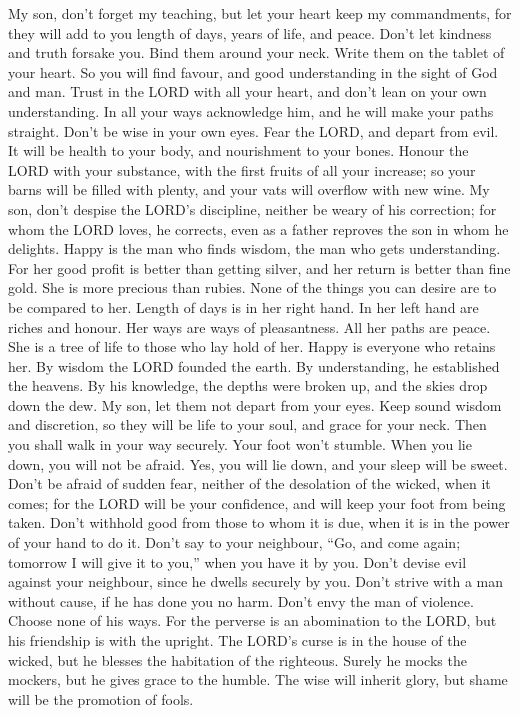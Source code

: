  My son, don't forget my teaching, but let your heart keep
my commandments,  for they will add to you length of days,
years of life, and peace.  Don't let kindness and truth
forsake you. Bind them around your neck. Write them on the tablet of
your heart.  So you will find favour, and good understanding
in the sight of God and man.  Trust in the LORD with all
your heart, and don't lean on your own understanding.  In
all your ways acknowledge him, and he will make your paths straight.
 Don't be wise in your own eyes. Fear the LORD, and depart
from evil.  It will be health to your body, and nourishment
to your bones.  Honour the LORD with your substance, with
the first fruits of all your increase;  so your barns will
be filled with plenty, and your vats will overflow with new wine.
 My son, don't despise the LORD's discipline, neither be
weary of his correction;  for whom the LORD loves, he
corrects, even as a father reproves the son in whom he delights.
 Happy is the man who finds wisdom, the man who gets
understanding.  For her good profit is better than getting
silver, and her return is better than fine gold.  She is
more precious than rubies. None of the things you can desire are to be
compared to her.  Length of days is in her right hand. In
her left hand are riches and honour.  Her ways are ways of
pleasantness. All her paths are peace.  She is a tree of
life to those who lay hold of her. Happy is everyone who retains her.
 By wisdom the LORD founded the earth. By understanding, he
established the heavens.  By his knowledge, the depths were
broken up, and the skies drop down the dew.  My son, let
them not depart from your eyes. Keep sound wisdom and discretion,
 so they will be life to your soul, and grace for your
neck.  Then you shall walk in your way securely. Your foot
won't stumble.  When you lie down, you will not be afraid.
Yes, you will lie down, and your sleep will be sweet. 
Don't be afraid of sudden fear, neither of the desolation of the wicked,
when it comes;  for the LORD will be your confidence, and
will keep your foot from being taken.  Don't withhold good
from those to whom it is due, when it is in the power of your hand to do
it.  Don't say to your neighbour, ``Go, and come again;
tomorrow I will give it to you,'' when you have it by you. 
Don't devise evil against your neighbour, since he dwells securely by
you.  Don't strive with a man without cause, if he has done
you no harm.  Don't envy the man of violence. Choose none
of his ways.  For the perverse is an abomination to the
LORD, but his friendship is with the upright.  The LORD's
curse is in the house of the wicked, but he blesses the habitation of
the righteous.  Surely he mocks the mockers, but he gives
grace to the humble.  The wise will inherit glory, but
shame will be the promotion of fools.

